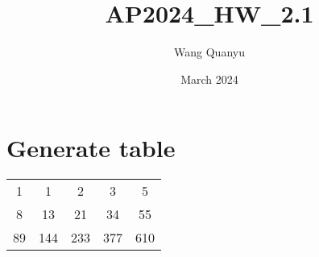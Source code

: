 \documentclass{article}
\title{AP2024\_HW\_2.1}
\author{Wang Quanyu}
\date{March 2024}
\begin{document}
\maketitle

\section{Generate table}

\begin{tabular}{|c|c|c|c|c|}
\hline
1 & 1 & 2 & 3 & 5 \\
8 & 13 & 21 & 34 & 55 \\
89 & 144 & 233 & 377 & 610 \\
\hline
\end{tabular}
\end{document}
